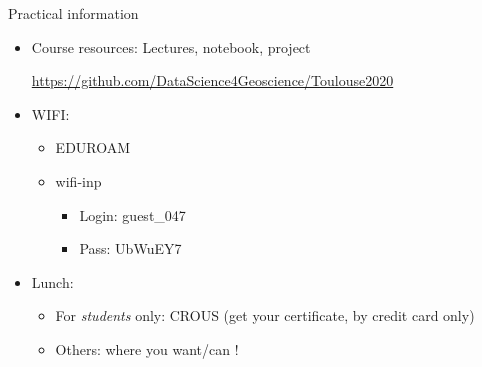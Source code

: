 \documentclass[pressentation,10pt,aspectratio=1610, xcolor=table]{beamer}
\begin{document}
\begin{frame}[label={sec:org24d336e}]{Practical information}
\begin{itemize}
\item Course resources: Lectures, notebook, project
\begin{center}
\url{https://github.com/DataScience4Geoscience/Toulouse2020}
\end{center}
\item WIFI:
\begin{itemize}
\item EDUROAM
\item wifi-inp
\begin{itemize}
\item Login: guest\_047
\item Pass: UbWuEY7
\end{itemize}
\end{itemize}
\item Lunch:
\begin{itemize}
\item For \emph{students} only: CROUS (get your certificate, by credit card only)
\item Others: where you want/can !
\end{itemize}
\end{itemize}
\end{frame}
\end{document}
